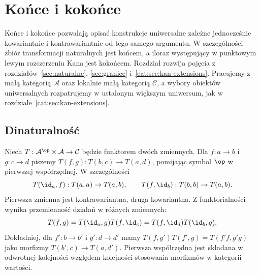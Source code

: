 \section{Końce i kokońce}\label{cat:sec:ends-coends}
Końce i kokońce pozwalają opisać konstrukcje uniwersalne zależne jednocześnie kowariantnie i kontrawariantnie od tego samego argumentu. W szczególności zbiór transformacji naturalnych jest końcem, a iloraz występujący w punktowym lewym rozszerzeniu Kana jest kokońcem. Rozdział rozwija pojęcia z rozdziałów~\ref{sec:naturalne}, \ref{sec:granice} i~\ref{cat:sec:kan-extensions}. Pracujemy z małą kategorią $\mathcal A$ oraz lokalnie małą kategorią $\mathcal C$, a wybory obiektów uniwersalnych rozpatrujemy w ustalonym większym uniwersum, jak w rozdziale~\ref{cat:sec:kan-extensions}.

\subsection{Dinaturalność}
Niech $T:\mathcal A^{\op}\times\mathcal A\to\mathcal C$ będzie funktorem dwóch zmiennych. Dla $f:a\to b$ i $g:c\to d$ piszemy $T(f,g):T(b,c)\to T(a,d)$, pomijając symbol $\op$ w pierwszej współrzędnej. W szczególności
\[
 T(\id_a,f):T(a,a)\to T(a,b),\qquad
 T(f,\id_b):T(b,b)\to T(a,b).
\]
Pierwsza zmienna jest kontrawariantna, druga kowariantna. Z funktorialności wynika przemienność działań w różnych zmiennych:
\[
 T(f,g)=T(\id_a,g)T(f,\id_c)
       =T(f,\id_d)T(\id_b,g).
\]
Dokładniej, dla $f':b\to b'$ i $g':d\to d'$ mamy $T(f,g')T(f',g)=T(f'f,g'g)$ jako morfizmy $T(b',c)\to T(a,d')$. Pierwsza współrzędna jest składana w odwrotnej kolejności względem kolejności stosowania morfizmów w kategorii wartości.

